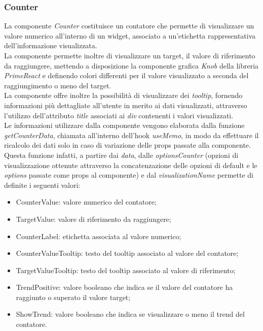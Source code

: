 \subsubsection{Counter}
La componente \textit{Counter} costituisce un contatore che permette di visualizzare un valore numerico all'interno di un widget, associato a un'etichetta
rappresentativa dell'informazione visualizzata. \\
La componente permette inoltre di visualizzare un target, il valore di riferimento da raggiungere, mettendo a disposizione la componente grafica \textit{Knob}
della libreria \textit{PrimeReact} e definendo colori differenti per il valore visualizzato a seconda del raggiungimento o meno del target. \\
La componente offre inoltre la possibilità di visualizzare dei \textit{tooltip}, fornendo informazioni più dettagliate all'utente
in merito ai dati visualizzati, attraverso l'utilizzo dell'attributo \textit{title} associati ai \textit{div} contenenti i valori visualizzati. \\
Le informazioni utilizzare dalla componente vengono elaborata dalla funzione \textit{getCounterData}, chiamata all'interno dell'hook \textit{useMemo}, in modo da
effettuare il ricalcolo dei dati solo in caso di variazione delle props passate alla componente. Questa funzione infatti, a partire dai \textit{data}, dalle \textit{optionsCounter}
(opzioni di visualizzazione ottenute attraverso la concatenzazione delle opzioni di default e le \textit{options} passate come props al componente) e dal \textit{visualizationName}
permette di definite i seguenti valori:
\begin{itemize}
    \item CounterValue: valore numerico del contatore;
    \item TargetValue: valore di riferimento da raggiungere;
    \item CounterLabel: etichetta associata al valore numerico;
    \item CounterValueTooltip: testo del tooltip associato al valore del contatore;
    \item TargetValueTooltip: testo del tooltip associato al valore di riferimento;
    \item TrendPositive: valore booleano che indica se il valore del contatore ha raggiunto o superato il valore target;
    \item ShowTrend: valore booleano che indica se visualizzare o meno il trend del contatore.
\end{itemize}
